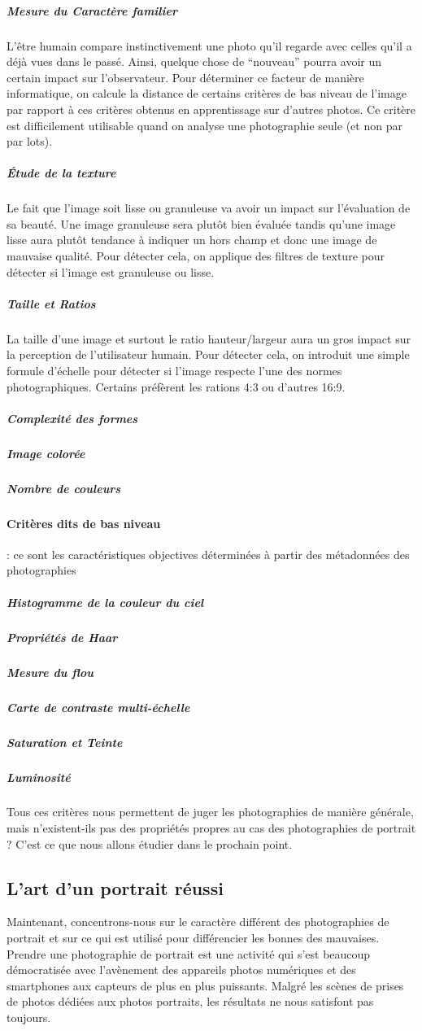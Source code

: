 \documentclass[11pt, french]{report-rd-info}
\begin{document}
\subparagraph{Mesure du Caractère familier}
L’être humain compare instinctivement une photo qu’il regarde avec celles qu’il a déjà vues dans le passé. Ainsi, quelque chose de “nouveau” pourra avoir un certain impact sur l’observateur. Pour déterminer ce facteur de manière informatique, on calcule la distance de certains critères de bas niveau de l’image par rapport à ces critères obtenus en apprentissage sur d’autres photos. Ce critère est difficilement utilisable quand on analyse une photographie seule (et non par par lots).

\subparagraph{Étude de la texture}
Le fait que l’image soit lisse ou granuleuse va avoir un impact sur l’évaluation de sa beauté. Une image granuleuse sera plutôt bien évaluée tandis qu’une image lisse aura plutôt tendance à indiquer un hors champ et donc une image de mauvaise qualité. Pour détecter cela, on applique des filtres de texture pour détecter si l’image est granuleuse ou lisse.

\subparagraph{Taille et Ratios}
La taille d’une image et surtout le ratio hauteur/largeur aura un gros impact sur la perception de l’utilisateur humain. Pour détecter cela, on introduit une simple formule d’échelle pour détecter si l’image respecte l’une des normes photographiques. Certains préfèrent les rations 4:3 ou d’autres 16:9.

\subparagraph{Complexité des formes}
\subparagraph{Image colorée}
\subparagraph{Nombre de couleurs}


\paragraph{Critères dits de bas niveau} : ce sont les caractéristiques objectives déterminées à partir des métadonnées des photographies
\subparagraph{Histogramme de la couleur du ciel}
\subparagraph{Propriétés de Haar}
\subparagraph{Mesure du flou}
\subparagraph{Carte de contraste multi-échelle}
\subparagraph{Saturation et Teinte}
\subparagraph{Luminosité}
\subparagraph{}
Tous ces critères nous permettent de juger les photographies de manière générale, mais n'existent-ils pas des propriétés propres au cas des photographies de portrait ? C'est ce que nous allons étudier dans le prochain point.



\subsection{L’art d’un portrait réussi}
Maintenant, concentrons-nous sur le caractère différent des photographies de portrait et sur ce qui est utilisé pour différencier les bonnes des mauvaises.
Prendre une photographie de portrait est une activité qui s'est beaucoup démocratisée avec l'avènement des appareils photos numériques et des smartphones aux capteurs de plus en plus puissants. Malgré les scènes de prises de photos dédiées aux photos portraits, les résultats ne nous satisfont pas toujours.
\end{document}
